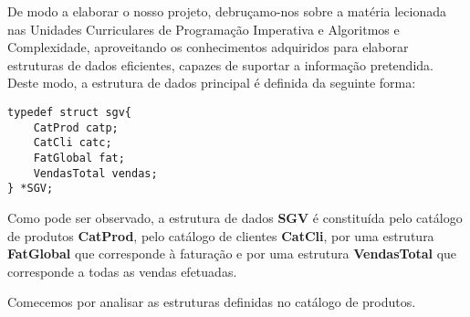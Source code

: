 \documentclass{article}
\begin{document}
\par\noindent\hspace{0.52cm}De modo a elaborar o nosso projeto, debruçamo-nos sobre a matéria lecionada nas Unidades Curriculares de Programação Imperativa e Algoritmos e Complexidade, aproveitando os conhecimentos adquiridos para elaborar estruturas de dados eficientes, capazes de suportar a informação pretendida. Deste modo, a estrutura de dados principal é definida da seguinte forma: 
\\


\begin{lstlisting}
typedef struct sgv{
	CatProd catp;
	CatCli catc;
	FatGlobal fat;
	VendasTotal vendas;
} *SGV;
\end{lstlisting}

Como pode ser observado, a estrutura de dados \textbf{SGV} é constituída pelo catálogo de produtos \textbf{CatProd}, pelo catálogo de clientes \textbf{CatCli}, por uma estrutura \textbf{FatGlobal} que corresponde à faturação e por uma estrutura \textbf{VendasTotal} que corresponde a todas as vendas efetuadas.

Comecemos por analisar as estruturas definidas no catálogo de produtos.
\\

\end{document}
